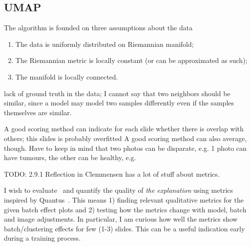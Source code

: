 \documentclass[10pt,twocolumn,letterpaper]{article}
\begin{document}
\subsection{UMAP}
 The algorithm is founded on three assumptions about the data
 \begin{enumerate}
   \item The data is uniformly distributed on Riemannian manifold;
   \item The Riemannian metric is locally constant (or can be approximated as such);
   \item The manifold is locally connected.
 \end{enumerate}

lack of ground truth in the data; I cannot say that two neighbors should be similar, since a model may model two samples differently even if the samples themselves are similar.

A good scoring method can indicate for each slide whether there is overlap with others; this slides is probably overfitted
A good scoring method can also average, though.
Have to keep in mind that two photos can be disparate, e.g. 1 photo can have tumours, the other can be healthy, e.g.

TODO: 2.9.1 Reflection in Clemmensen has a lot of stuff about metrics.

I wish to evaluate~\cite{sslUMAP} and quantify the quality of \textit{the explanation} using metrics inspired by Quantus~\cite{hedstrom2023quantus}. This means 1) finding relevant qualitative metrics for the given batch effect plots and 2) testing how the metrics change with model, batch and image adjustments. In particular, I am curious how well the metrics show batch/clustering effects for few (1-3) slides. This can be a useful indication early during a training process.

{\small


}
\end{document}
